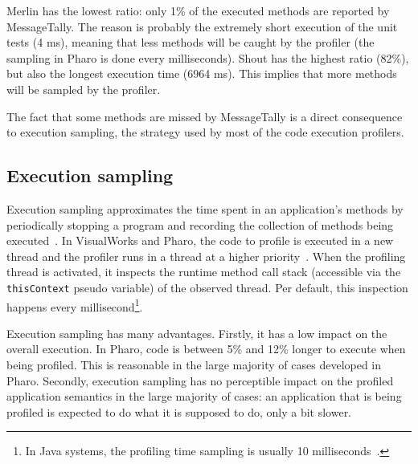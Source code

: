 \documentclass{sig-alternate}
\newcommand{\ct}{\lstinline[backgroundcolor=\color{white},basicstyle=\footnotesize\ttfamily]}
\begin{document}
Merlin has the lowest ratio: only 1\% of the executed methods are reported by MessageTally. The reason is probably the extremely short execution of the unit tests (4 ms), meaning that less methods will be caught by the profiler (the sampling in Pharo is done every milliseconds). 
Shout has the highest ratio (82\%), but also the longest execution time (6964 ms). This implies that more methods will be sampled by the profiler. 

The fact that some methods are missed by MessageTally is a direct consequence to execution sampling, the strategy used by most of the code execution profilers.


\subsection{Execution sampling}
Execution sampling approximates the time spent in an application's methods by periodically stopping a program and recording the collection of methods being executed~\cite{Whal00a}. In VisualWorks and Pharo, the code to profile is executed in a new thread and the profiler runs in a thread at a higher priority~\cite{Berg11d}. 
When the profiling thread is activated, it inspects the runtime method call stack (accessible via the \ct{thisContext} pseudo variable) of the observed thread. Per default, this inspection happens every millisecond\footnote{In Java systems, the profiling time sampling is usually 10 milliseconds~\cite{Mytk10a}.}. 

Execution sampling has many advantages. Firstly, it has a low impact on the overall execution. In Pharo, code is between 5\% and 12\% longer to execute when being profiled. This is reasonable in the large majority of cases developed in Pharo. 
Secondly, execution sampling has no perceptible impact on the profiled application semantics in the large majority of cases: an application that is being profiled is expected to do what it is supposed to do, only a bit slower. %

\end{document}
